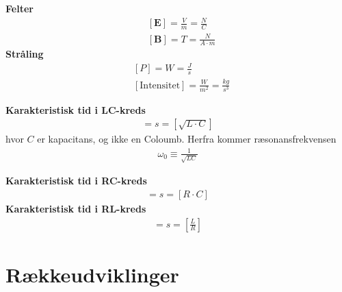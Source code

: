 \documentclass[a4paper]{article}
\begin{document}
    \textbf{Felter} 
    \begin{align*}
        &[\mathbf{E}] = \frac{V}{m} = \frac{N}{C}\\
        &\left[ \mathbf{B} \right] = T = \frac{N}{A \cdot m}
    \end{align*}
    \textbf{Stråling}
    \begin{align*}
        &\left[ P \right] = W = \frac{J}{s}\\
        &\left[ \text{Intensitet} \right] = \frac{W}{m^{2}} = \frac{kg}{s^3}
    \end{align*} 

    \textbf{Karakteristisk tid i LC-kreds}\begin{align*}
        [\tau] = s = [\sqrt{L\cdot C}]
    \end{align*}  
    hvor \(C\) er kapacitans, og ikke en Coloumb. Herfra kommer ræsonansfrekvensen \begin{align*}
        \omega _0 \equiv \frac{1}{\sqrt{LC} }
    \end{align*}

    \textbf{Karakteristisk tid i RC-kreds}
    \begin{align*}
        [\tau] = s = [R\cdot C]
    \end{align*}
    \textbf{Karakteristisk tid i RL-kreds} 
    \begin{align*}
        [\tau] = s = \left[ \frac{L}{R} \right] 
    \end{align*}

    \newpage

    \section{Rækkeudviklinger}
\end{document}
